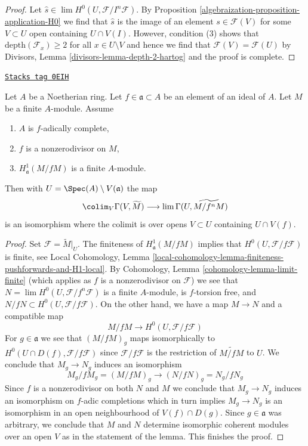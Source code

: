 \begin{proof}

Let $\hat s \in \lim H^0(U, \mathcal{F}/I^n\mathcal{F})$.
By Proposition \ref{algebraization-proposition-application-H0}
we find that $\hat s$ is the image of an element $s \in \mathcal{F}(V)$
for some $V \subset U$ open containing $U \cap V(I)$.
However, condition (3) shows that $\text{depth}(\mathcal{F}_x) \geq 2$
for all $x \in U \setminus V$ and hence we find that
$\mathcal{F}(V) = \mathcal{F}(U)$ by
Divisors, Lemma \ref{divisors-lemma-depth-2-hartog}
and the proof is complete.
\end{proof}

\begin{lemma}
\label{algebraization-lemma-alternative-colim-H0}
\href{https://stacks.math.columbia.edu/tag/0EIH}{\texttt{Stacks tag 0EIH}}

Let $A$ be a Noetherian ring. Let $f \in \mathfrak a \subset A$
be an element of an ideal of $A$. Let $M$ be a finite $A$-module.
Assume
\begin{enumerate}
\item $A$ is $f$-adically complete,
\item $f$ is a nonzerodivisor on $M$,
\item $H^1_\mathfrak a(M/fM)$ is a finite $A$-module.
\end{enumerate}
Then with $U = \Spec(A) \setminus V(\mathfrak a)$ the map
$$
\colim_V \Gamma(V, \widetilde{M})
\longrightarrow
\lim \Gamma(U, \widetilde{M/f^nM})
$$
is an isomorphism where the colimit is over opens $V \subset U$
containing $U \cap V(f)$.
\end{lemma}

\begin{proof}
Set $\mathcal{F} = \widetilde{M}|_U$.
The finiteness of $H^1_\mathfrak a(M/fM)$ implies that
$H^0(U, \mathcal{F}/f\mathcal{F})$ is finite, see
Local Cohomology, Lemma
\ref{local-cohomology-lemma-finiteness-pushforwards-and-H1-local}.
By Cohomology, Lemma \ref{cohomology-lemma-limit-finite}
(which applies as $f$ is a nonzerodivisor on $\mathcal{F}$)
we see that $N = \lim H^0(U, \mathcal{F}/f^n\mathcal{F})$
is a finite $A$-module, is $f$-torsion free, and
$N/fN \subset H^0(U, \mathcal{F}/f\mathcal{F})$.
On the other hand, we have a map $M \to N$ and a compatible map
$$
M/fM \longrightarrow H^0(U, \mathcal{F}/f\mathcal{F})
$$
For $g \in \mathfrak a$ we see that $(M/fM)_g$ maps isomorphically
to $H^0(U \cap D(f), \mathcal{F}/f\mathcal{F})$ since
$\mathcal{F}/f\mathcal{F}$ is the restriction of $\widetilde{M/fM}$ to $U$.
We conclude that $M_g \to N_g$ induces an isomorphism
$$
M_g/fM_g = (M/fM)_g \to (N/fN)_g = N_g/fN_g
$$
Since $f$ is a nonzerodivisor on both $N$ and $M$ we conclude
that $M_g \to N_g$ induces an isomorphism on $f$-adic completions
which in turn implies $M_g \to N_g$ is an isomorphism in an open
neighbourhood of $V(f) \cap D(g)$.
Since $g \in \mathfrak a$ was arbitrary, we conclude that $M$ and $N$
determine isomorphic coherent modules over an open $V$
as in the statement of the lemma. This finishes the proof.
\end{proof}

